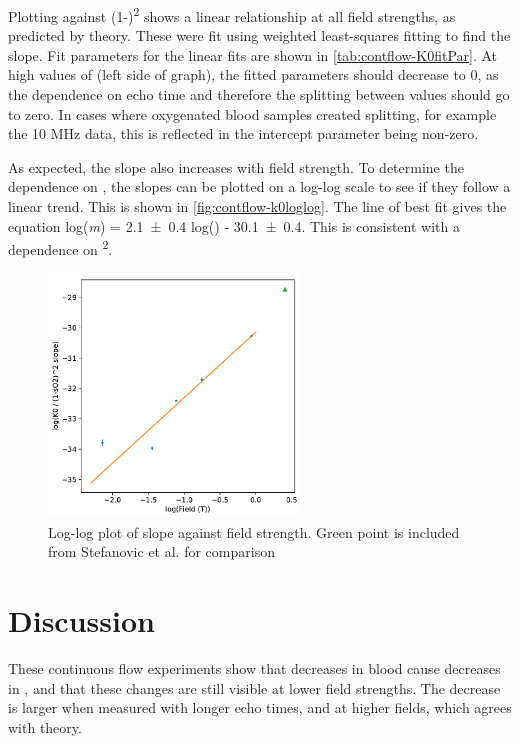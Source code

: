 Plotting \Kzero against (1-\SOtwo)\textsuperscript{2} shows a linear relationship at all field strengths, as predicted by theory.
These were fit using weighted least-squares fitting to find the slope.
Fit parameters for the linear fits are shown in \autoref{tab:contflow-K0fitPar}.
At high values of \SOtwo (left side of graph), the fitted \Kzero parameters should decrease to 0, as the dependence on echo time and therefore the splitting between \Ttwo values should go to zero.
In cases where oxygenated blood samples created splitting, for example the 10 MHz data, this is reflected in the intercept parameter being non-zero.

As expected, the slope also increases with field strength.
To determine the dependence on \Bzero, the slopes can be plotted on a log-log scale to see if they follow a linear trend.
This is shown in \autoref{fig:contflow-k0loglog}.
The line of best fit gives the equation log(\textit{m}) = \num{2.1\pm0.4} log(\Bzero) - \num{30.1\pm0.4}.
This is consistent with a dependence on \Bzero\textsuperscript{2}.

\begin{figure}[tbh]
\centering
\includegraphics[width=0.6\textwidth]{figures/contflow/k0slopefield.pdf}
\caption[\Kzero slope dependence on \Bzero]{Log-log plot of \Kzero slope against field strength. Green point is included from Stefanovic et al. for comparison \cite{StefanovicHumanwholebloodrelaxometry2004}}
\label{fig:contflow-k0loglog}
\end{figure}

\section{Discussion}
These continuous flow experiments show that decreases in blood \SOtwo cause decreases in \Ttwo, and that these changes are still visible at lower field strengths.
The \Ttwo decrease is larger when measured with longer echo times, and at higher fields, which agrees with theory.

